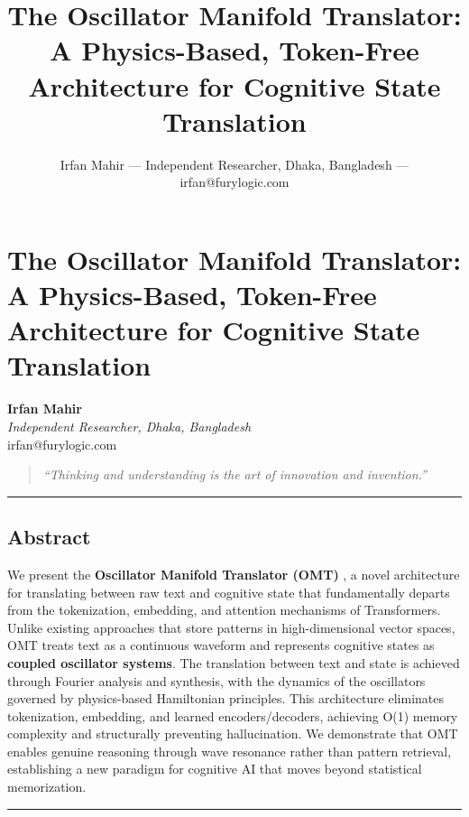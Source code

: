 \documentclass[
  11pt,
  a4paper,
]{article}
\title{The Oscillator Manifold Translator: A Physics-Based, Token-Free
Architecture for Cognitive State Translation}
\author{Irfan Mahir --- Independent Researcher, Dhaka, Bangladesh ---
irfan@furylogic.com}
\date{}
\begin{document}
\maketitle

{
\hypersetup{linkcolor=}
\setcounter{tocdepth}{3}
\tableofcontents
}
\section{The Oscillator Manifold Translator: A Physics-Based, Token-Free
Architecture for Cognitive State
Translation}\label{the-oscillator-manifold-translator-a-physics-based-token-free-architecture-for-cognitive-state-translation}

\textbf{Irfan Mahir}\\
\emph{Independent Researcher, Dhaka, Bangladesh}\\
irfan@furylogic.com

\begin{quote}
\emph{``Thinking and understanding is the art of innovation and
invention.''}
\end{quote}

\begin{center}\rule{0.5\linewidth}{0.5pt}\end{center}

\subsection{Abstract}\label{abstract}

We present the \textbf{Oscillator Manifold Translator (OMT)} , a novel
architecture for translating between raw text and cognitive state that
fundamentally departs from the tokenization, embedding, and attention
mechanisms of Transformers. Unlike existing approaches that store
patterns in high-dimensional vector spaces, OMT treats text as a
continuous waveform and represents cognitive states as \textbf{coupled
oscillator systems}. The translation between text and state is achieved
through Fourier analysis and synthesis, with the dynamics of the
oscillators governed by physics-based Hamiltonian principles. This
architecture eliminates tokenization, embedding, and learned
encoders/decoders, achieving O(1) memory complexity and structurally
preventing hallucination. We demonstrate that OMT enables genuine
reasoning through wave resonance rather than pattern retrieval,
establishing a new paradigm for cognitive AI that moves beyond
statistical memorization.

\begin{center}\rule{0.5\linewidth}{0.5pt}\end{center}
\end{document}
